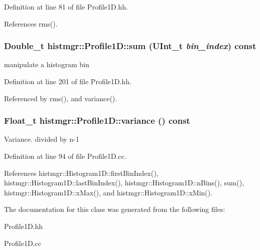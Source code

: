 Definition at line 81 of file Profile1D.hh.

References rms().
\subsubsection[{sum}]{\setlength{\rightskip}{0pt plus 5cm}Double\_\-t histmgr::Profile1D::sum (UInt\_\-t {\em bin\_\-index}) const\hspace{0.3cm}{\ttfamily  [inline]}}\label{classhistmgr_1_1Profile1D_a6abef8f36f84aa8580def449b7741753}
manipulate a histogram bin 

Definition at line 201 of file Profile1D.hh.

Referenced by rms(), and variance().
\subsubsection[{variance}]{\setlength{\rightskip}{0pt plus 5cm}Float\_\-t histmgr::Profile1D::variance () const}\label{classhistmgr_1_1Profile1D_afb01c1ced0cf5541fd8928ab07c78e5e}


Variance. divided by n-\/1 

Definition at line 94 of file Profile1D.cc.

References histmgr::Histogram1D::firstBinIndex(), histmgr::Histogram1D::lastBinIndex(), histmgr::Histogram1D::nBins(), sum(), histmgr::Histogram1D::xMax(), and histmgr::Histogram1D::xMin().

The documentation for this class was generated from the following files:\begin{DoxyCompactItemize}
\item 
Profile1D.hh\item 
Profile1D.cc\end{DoxyCompactItemize}
